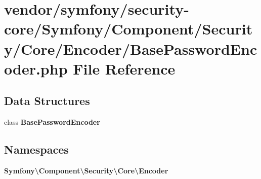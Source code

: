 \section{vendor/symfony/security-\/core/\+Symfony/\+Component/\+Security/\+Core/\+Encoder/\+Base\+Password\+Encoder.php File Reference}
\label{_base_password_encoder_8php}
\subsection*{Data Structures}
\begin{DoxyCompactItemize}
\item 
class {\bf Base\+Password\+Encoder}
\end{DoxyCompactItemize}
\subsection*{Namespaces}
\begin{DoxyCompactItemize}
\item 
 {\bf Symfony\textbackslash{}\+Component\textbackslash{}\+Security\textbackslash{}\+Core\textbackslash{}\+Encoder}
\end{DoxyCompactItemize}

